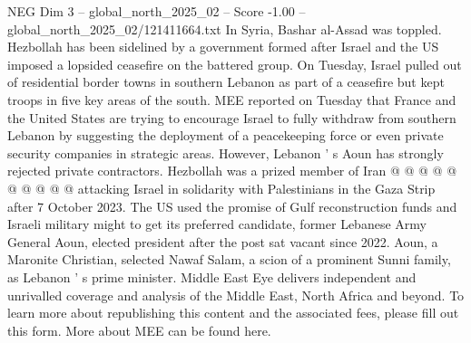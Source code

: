 \begin{textsample}{NEG Dim 3 – global\_north\_2025\_02 – Score -1.00 – global\_north\_2025\_02/121411664.txt}
In Syria, Bashar al-Assad was toppled.
Hezbollah has been sidelined by a government formed after Israel and the US imposed a lopsided ceasefire on the battered group.
On Tuesday, Israel pulled out of residential border towns in southern Lebanon as part of a ceasefire but kept troops in five key areas of the south.
MEE reported on Tuesday that France and the United States are trying to encourage Israel to fully withdraw from southern Lebanon by suggesting the deployment of a peacekeeping force or even private security companies in strategic areas.
However, Lebanon ' s Aoun has strongly rejected private contractors.
Hezbollah was a prized member of Iran @ @ @ @ @ @ @ @ @ @ attacking Israel in solidarity with Palestinians in the Gaza Strip after 7 October 2023.
The US used the promise of Gulf reconstruction funds and Israeli military might to get its preferred candidate, former Lebanese Army General Aoun, elected president after the post sat vacant since 2022.
Aoun, a Maronite Christian, selected Nawaf Salam, a scion of a prominent Sunni family, as Lebanon ' s prime minister.
Middle East Eye delivers independent and unrivalled coverage and analysis of the Middle East, North Africa and beyond.
To learn more about republishing this content and the associated fees, please fill out this form.
More about MEE can be found here.

\end{textsample}
